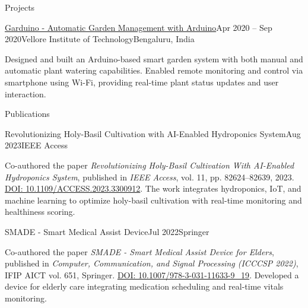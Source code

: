 \documentclass{resume}
\newcommand{\plainitem}[1]{\item{#1}}
\begin{document}
\begin{rSection}{Projects}
\begin{rSubsectionNoBullet}{\href{https://docs.google.com/document/d/1x4zfeQhCVb3S7J35QM56Sth9_4soquWMxKuBpIZtCDQ/edit?usp=sharing}{Garduino - Automatic Garden Management with Arduino}}{Apr 2020 – Sep 2020}{Vellore Institute of Technology}{Bengaluru, India}
    \item {Designed and built an Arduino-based smart garden system with both manual and automatic plant watering capabilities. Enabled remote monitoring and control via smartphone using Wi-Fi, providing real-time plant status updates and user interaction.}
\end{rSubsectionNoBullet}


\end{rSection}


\begin{rSection}{Publications}

\begin{rSubsectionNoBullet}{Revolutionizing Holy-Basil Cultivation with AI-Enabled Hydroponics System}{Aug 2023}{IEEE Access}{} 
    \plainitem{Co-authored the paper \textit{Revolutionizing Holy-Basil Cultivation With AI-Enabled Hydroponics System}, published in \textit{IEEE Access}, vol. 11, pp. 82624–82639, 2023. \href{https://ieeexplore.ieee.org/document/10198435}{DOI: 10.1109/ACCESS.2023.3300912}. The work integrates hydroponics, IoT, and machine learning to optimize holy-basil cultivation with real-time monitoring and healthiness scoring.}
\end{rSubsectionNoBullet}

\begin{rSubsectionNoBullet}{SMADE - Smart Medical Assist Device}{Jul 2022}{Springer} 
    \plainitem{Co-authored the paper \textit{SMADE - Smart Medical Assist Device for Elders}, published in \textit{Computer, Communication, and Signal Processing (ICCCSP 2022)}, IFIP AICT vol. 651, Springer. \href{https://doi.org/10.1007/978-3-031-11633-9_19}{DOI: 10.1007/978-3-031-11633-9\_19}. Developed a device for elderly care integrating medication scheduling and real-time vitals monitoring.}
\end{rSubsectionNoBullet}

\end{rSection}
\end{document}
